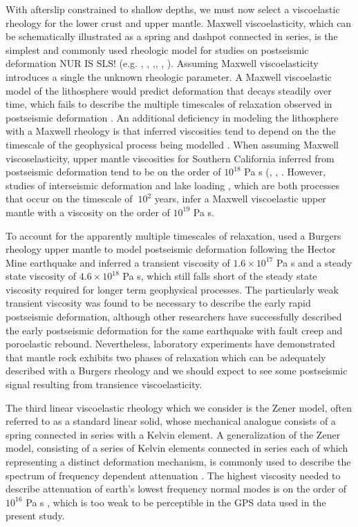 \documentclass[12pt]{article}
\begin{document}
With afterslip constrained to shallow depths, we must now select a viscoelastic rheology for the lower crust and upper mantle. Maxwell viscoelasticity, which can be schematically illustrated as a spring and dashpot connected in series, is the simplest and commonly used rheologic model for studies on postseismic deformation NUR IS SLS! (e.g. \cite{Nur1974}, \cite{Pollitz2000}, \cite{Hetland2003},\cite{Freed2006a}, \cite{Johnson2009}, \cite{Hearn2009}).  Assuming Maxwell viscoelasticity introduces a single the unknown rheologic parameter. A Maxwell viscoelastic model of the lithosphere would predict deformation that decays steadily over time, which fails to describe the multiple timescales of relaxation observed in postseismic deformation \cite{Savage1997}.  An additional deficiency in modeling the lithosphere with a Maxwell rheology is that inferred viscosities tend to depend on the the timescale of the geophysical process being modelled \cite{Peltier1981}. When assuming Maxwell viscoselasticity, upper mantle viscosities for Southern California inferred from postseismic deformation tend to be on the order of $10^{18}$ Pa s (\cite{Pollitz2000}, \cite{Thatcher2008}, \cite{Spinler2015}. However, studies of interseismic deformation \cite{Lundgren2009} and lake loading \cite{Luttrell2007}, which are both processes that occur on the timescale of $~10^2$ years, infer a Maxwell viscoelastic upper mantle with a viscosity on the order of $10^{19}$ Pa s.  

To account for the apparently multiple timescales of relaxation, \cite{Pollitz2003} used a Burgers rheology upper mantle to model postseismic deformation following the Hector Mine earthquake and inferred a transient viscosity of $1.6\times10^{17}$ Pa s and a steady state viscosity of $4.6\times10^{18}$ Pa s, which still falls short of the steady state viscosity required for longer term geophysical processes. The particularly weak transient viscosity was found to be necessary to describe the early rapid postseismic deformation, although other researchers have successfully described the early postseismic deformation for the same earthquake with fault creep and poroelastic rebound. Nevertheless, laboratory experiments have demonstrated that mantle rock exhibits two phases of relaxation which can be adequately described with a Burgers rheology \cite{Chopra1997} and we should expect to see some postseismic signal resulting from transience viscoelasticity. 

The third linear viscoelastic rheology which we consider is the Zener model, often referred to as a standard linear solid, whose mechanical analogue consists of a spring connected in series with a Kelvin element. A generalization of the Zener model, consisting of a series of Kelvin elements connected in series each of which representing a distinct deformation mechanism, is commonly used to describe the spectrum of frequency dependent attenuation \cite{Liu1976}.  The highest viscosity needed to describe attenuation of earth's lowest frequency normal modes is on the order of $10^{16}$ Pa s \cite{Yuen1982}, which is too weak to be perceptible in the GPS data used in the present study.  
\end{document}
